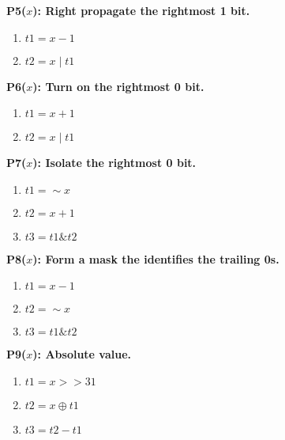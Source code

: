 \documentclass[a4paper]{llncs}
\begin{document}
\begin{figure}
\begin{multicols}{4}
   \vspace{12pt}
   
   \begin{minipage}{.2\textwidth}
   \bf{P5}($x$): Right propagate the rightmost 1 bit.
   \begin{enumerate}
    \item $t1 = x - 1$
    \item $t2 = x \mid t1$
   \end{enumerate}
   \end{minipage}

   \vspace{12pt}
   
   \begin{minipage}{.2\textwidth}
   \bf{P6}($x$): Turn on the rightmost 0 bit.
   \begin{enumerate}
    \item $t1 = x + 1$
    \item $t2 = x \mid t1$
   \end{enumerate}
   \end{minipage}
      \vspace{12pt}
   
   \begin{minipage}{.2\textwidth}
   \bf{P7}($x$): Isolate the rightmost 0 bit.
   \begin{enumerate}
    \item $t1 = \sim x$
    \item $t2 = x + 1$
    \item $t3 = t1 \& t2$
   \end{enumerate}
   \end{minipage}
   \vspace{12pt}
   
   \begin{minipage}{.2\textwidth}
   \bf{P8}($x$): Form a mask the identifies the trailing 0s.
   \begin{enumerate}
    \item $t1 = x -1$
    \item $t2 = \sim x$
    \item $t3 = t1 \& t2$
   \end{enumerate}
   \end{minipage}
   \vspace{12pt}
   
   \begin{minipage}{.2\textwidth}
   \bf{P9}($x$): Absolute value.
   \begin{enumerate}
    \item $t1 = x >> 31$
    \item $t2 = x \oplus t1$
    \item $t3 = t2 - t1$
   \end{enumerate}
   \end{minipage}


\end{multicols}
\end{figure}
\end{document}
